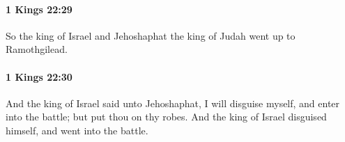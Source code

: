 		\paragraph{1 Kings 22:29} %
			\label{1KINGS-22-29}

			So the king of Israel and Jehoshaphat the king of Judah went up to Ramothgilead.


		\paragraph{1 Kings 22:30} %
			\label{1KINGS-22-30}

			And the king of Israel said unto Jehoshaphat, I will disguise myself, and enter into the battle; but put thou on thy robes. And the king of Israel disguised himself, and went into the battle.


